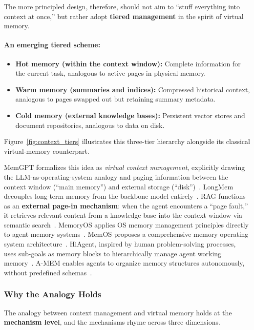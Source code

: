 The more principled design, therefore, should not aim to ``stuff everything into context at once,'' but rather adopt \textbf{tiered management} in the spirit of virtual memory.

\paragraph{An emerging tiered scheme:}
\begin{itemize}[nosep]
\item \textbf{Hot memory (within the context window):} Complete information for the current task, analogous to active pages in physical memory.
\item \textbf{Warm memory (summaries and indices):} Compressed historical context, analogous to pages swapped out but retaining summary metadata.
\item \textbf{Cold memory (external knowledge bases):} Persistent vector stores and document repositories, analogous to data on disk.
\end{itemize}

Figure~\ref{fig:context_tiers} illustrates this three-tier hierarchy alongside its classical virtual-memory counterpart.


MemGPT formalizes this idea as \textit{virtual context management}, explicitly drawing the LLM-as-operating-system analogy and paging information between the context window (``main memory'') and external storage (``disk'')~\cite{memgpt2023}.
LongMem decouples long-term memory from the backbone model entirely~\cite{longmem2023}.
RAG functions as an \textbf{external page-in mechanism}: when the agent encounters a ``page fault,'' it retrieves relevant content from a knowledge base into the context window via semantic search~\cite{lewis2020rag}.
MemoryOS applies OS memory management principles directly to agent memory systems~\cite{memoryos2025}.
MemOS proposes a comprehensive memory operating system architecture~\cite{memos2025}.
HiAgent, inspired by human problem-solving processes, uses sub-goals as memory blocks to hierarchically manage agent working memory~\cite{hiagent2024}.
A-MEM enables agents to organize memory structures autonomously, without predefined schemas~\cite{amem2025}.

\subsubsection{Why the Analogy Holds}

The analogy between context management and virtual memory holds at the \textbf{mechanism level}, and the mechanisms rhyme across three dimensions.

